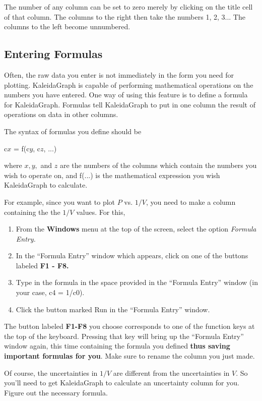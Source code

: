 The number of any column can be set to zero merely by clicking on the
title cell of that column. The columns to the right then take the
numbers 1, 2, 3... The columns to the left become unnumbered.

\subsection{Entering Formulas}

Often, the raw data you enter is not immediately in the form you need
for plotting. KaleidaGraph is capable of performing
mathematical operations on the numbers you have entered. One way of
using this feature is to define a formula for KaleidaGraph. Formulas
tell KaleidaGraph to put in one column the result of operations on
data in other columns.

The syntax of formulas you define should be
\begin{center}
c$x$ = f(c$y$, c$z$, ...)
\end{center}
where $x, y,$ and $z$ are the numbers of the columns which contain the
numbers you wish to operate on, and f(...) is the mathematical
expression you wish KaleidaGraph to calculate.

For example, since you want to plot $P$ vs. $1/V$,
you need to make a column containing
the the $1/V$ values. For this,

\noindent
\begin{enumerate}
\item From the {\bf Windows} menu at the top of the screen, select the option {\it
Formula Entry.}
\item In the ``Formula Entry'' window which appears, click on one of the buttons 
labeled {\bf F1 - F8.}
\item Type in the formula in the space provided in the ``Formula Entry'' window (in your case, c4 = 1/c0).
\item Click the button marked Run in the ``Formula Entry'' window.
\end{enumerate}
\indent

The button labeled {\bf F1-F8} you choose corresponds to one of the
function keys at the top of the keyboard. Pressing that key will bring
up the ``Formula Entry'' window again, this time containing the
formula you defined {\bf thus saving important formulas for you}. Make 
sure to rename the column you just made.

Of course, the uncertainties in $1/V$ are different from the
uncertainties in $V.$ So you'll need to get KaleidaGraph to calculate
an uncertainty column for you. Figure out the necessary formula.

